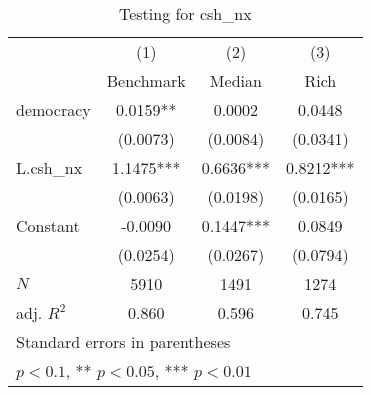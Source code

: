\begin{table}[htbp]\centering
\def\sym#1{\ifmmode^{#1}\else\(^{#1}\)\fi}
\caption{Testing for csh\_nx \label{tab:regression4}}
\begin{tabular}{l*{3}{c}}
\hline\hline
            &\multicolumn{1}{c}{(1)}&\multicolumn{1}{c}{(2)}&\multicolumn{1}{c}{(3)}\\
            &\multicolumn{1}{c}{Benchmark}&\multicolumn{1}{c}{Median}&\multicolumn{1}{c}{Rich}\\
\hline
democracy   &      0.0159** &      0.0002   &      0.0448   \\
            &    (0.0073)   &    (0.0084)   &    (0.0341)   \\
[1em]
L.csh\_nx    &      1.1475***&      0.6636***&      0.8212***\\
            &    (0.0063)   &    (0.0198)   &    (0.0165)   \\
[1em]
Constant    &     -0.0090   &      0.1447***&      0.0849   \\
            &    (0.0254)   &    (0.0267)   &    (0.0794)   \\
\hline
\(N\)       &        5910   &        1491   &        1274   \\
adj. \(R^{2}\)&       0.860   &       0.596   &       0.745   \\
\hline\hline
\multicolumn{4}{l}{\footnotesize Standard errors in parentheses}\\
\multicolumn{4}{l}{\footnotesize * \(p<0.1\), ** \(p<0.05\), *** \(p<0.01\)}\\
\end{tabular}
\end{table}
